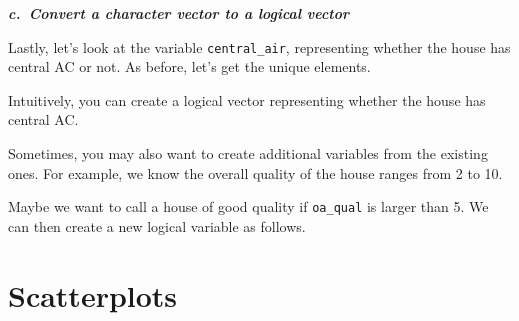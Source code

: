 \documentclass[
]{book}
\newenvironment{Shaded}{\begin{snugshade}}{\end{snugshade}}
\newcommand{\CommentTok}[1]{\textcolor[rgb]{0.56,0.35,0.01}{\textit{#1}}}
\newcommand{\DecValTok}[1]{\textcolor[rgb]{0.00,0.00,0.81}{#1}}
\newcommand{\FunctionTok}[1]{\textcolor[rgb]{0.00,0.00,0.00}{#1}}
\newcommand{\NormalTok}[1]{#1}
\newcommand{\OtherTok}[1]{\textcolor[rgb]{0.56,0.35,0.01}{#1}}
\newcommand{\SpecialCharTok}[1]{\textcolor[rgb]{0.00,0.00,0.00}{#1}}
\newcommand{\StringTok}[1]{\textcolor[rgb]{0.31,0.60,0.02}{#1}}
\begin{document}
\textbf{\emph{c.~Convert a character vector to a logical vector}}

Lastly, let's look at the variable \texttt{central\_air}, representing whether the house has central AC or not. As before, let's get the unique elements.

\begin{Shaded}
\end{Shaded}

Intuitively, you can create a logical vector representing whether the house has central AC.

\begin{Shaded}
\end{Shaded}

Sometimes, you may also want to create additional variables from the existing ones. For example, we know the overall quality of the house ranges from 2 to 10.

\begin{Shaded}
\end{Shaded}

Maybe we want to call a house of good quality if \texttt{oa\_qual} is larger than 5. We can then create a new logical variable as follows.

\begin{Shaded}
\end{Shaded}

\hypertarget{scatterplots}{%
\section{Scatterplots}\label{scatterplots}}
\end{document}
